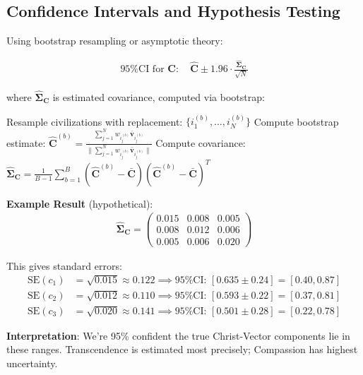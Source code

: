 \documentclass[11pt,a4paper]{article}
\theoremstyle{definition}
\theoremstyle{remark}
\begin{document}
\subsection{Confidence Intervals and Hypothesis Testing}

Using bootstrap resampling or asymptotic theory:

\begin{align}
\text{95\% CI for } \mathbf{C}: \quad \hat{\mathbf{C}} \pm 1.96 \cdot \frac{\hat{\boldsymbol{\Sigma}}_{\mathbf{C}}}{\sqrt{N}}
\end{align}

where \(\hat{\boldsymbol{\Sigma}}_{\mathbf{C}}\) is estimated covariance, computed via bootstrap:

\begin{algorithmic}[1]
    \State Resample civilizations with replacement: \(\{i_1^{(b)}, \ldots, i_N^{(b)}\}\)
    \State Compute bootstrap estimate: \(\hat{\mathbf{C}}^{(b)} = \frac{\sum_{j=1}^N w_{i_j^{(b)}} \bar{\mathbf{v}}_{i_j^{(b)}}}{\|\sum_{j=1}^N w_{i_j^{(b)}} \bar{\mathbf{v}}_{i_j^{(b)}}\|}\)
\EndFor
\State Compute covariance: \(\hat{\boldsymbol{\Sigma}}_{\mathbf{C}} = \frac{1}{B-1}\sum_{b=1}^B (\hat{\mathbf{C}}^{(b)} - \bar{\mathbf{C}})(\hat{\mathbf{C}}^{(b)} - \bar{\mathbf{C}})^T\)
\end{algorithmic}

\textbf{Example Result} (hypothetical):
\begin{align}
\hat{\boldsymbol{\Sigma}}_{\mathbf{C}} = \begin{pmatrix}
0.015 & 0.008 & 0.005 \\
0.008 & 0.012 & 0.006 \\
0.005 & 0.006 & 0.020
\end{pmatrix}
\end{align}

This gives standard errors:
\begin{align}
\text{SE}(c_1) &= \sqrt{0.015} \approx 0.122 \implies \text{95\% CI: } [0.635 \pm 0.24] = [0.40, 0.87] \\
\text{SE}(c_2) &= \sqrt{0.012} \approx 0.110 \implies \text{95\% CI: } [0.593 \pm 0.22] = [0.37, 0.81] \\
\text{SE}(c_3) &= \sqrt{0.020} \approx 0.141 \implies \text{95\% CI: } [0.501 \pm 0.28] = [0.22, 0.78]
\end{align}

\textbf{Interpretation}: We're 95\% confident the true Christ-Vector components lie in these ranges. Transcendence is estimated most precisely; Compassion has highest uncertainty.
\end{document}
